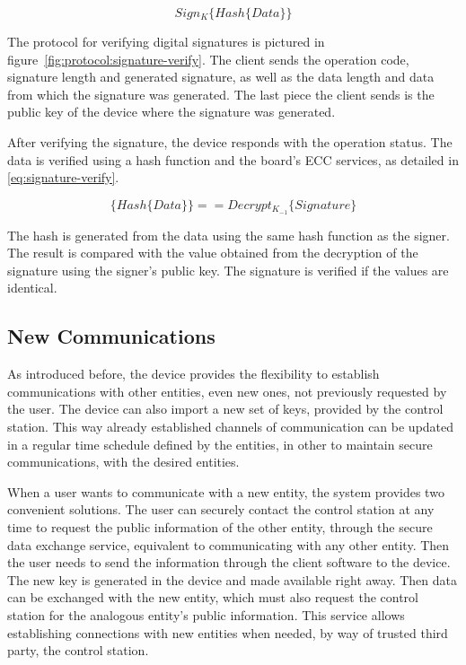 \begin{equation}
	\label{eq:signature-generate}
	Sign_{K}\{Hash\{Data\}\}
\end{equation}

The protocol for verifying digital signatures is pictured in figure~\ref{fig:protocol:signature-verify}.
The client sends the operation code, signature length and generated signature, as well as the data length and data from which the signature was generated. The last piece the client sends is the public key of the device where the signature was generated.

After verifying the signature, the device responds with the operation status.
The data is verified using a hash function and the board's \ac{ECC} services, as detailed in \ref{eq:signature-verify}.

\begin{equation}
	\label{eq:signature-verify}
	\{Hash\{Data\}\} == Decrypt_{K_{-1}}\{Signature\}
\end{equation}

The hash is generated from the data using the same hash function as the signer. The result is compared with the value obtained from the decryption of the signature using the signer's public key. The signature is verified if the values are identical.

\subsection{New Communications}\label{chap:arch:services:new-comms}

As introduced before, the device provides the flexibility to establish communications with other entities, even new ones, not previously requested by the user.
The device can also import a new set of keys, provided by the control station.
This way already established channels of communication can be updated in a regular time schedule defined by the entities, in other to maintain secure communications, with the desired entities.

When a user wants to communicate with a new entity, the system provides two convenient solutions. The user can securely contact the control station at any time to request the public information of the other entity, through the secure data exchange service, equivalent to communicating with any other entity.
Then the user needs to send the information through the client software to the device. The new key is generated in the device and made available right away. Then data can be exchanged with the new entity, which must also request the control station for the analogous entity's public information.
This service allows establishing connections with new entities when needed, by way of trusted third party, the control station. 

